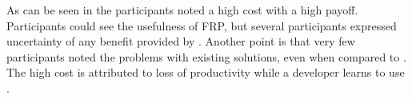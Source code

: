 As can be seen in  the participants noted a high cost with a high payoff. Participants could see the usefulness of \gls{FRP}, but several participants expressed uncertainty of any benefit provided by \fsh. Another point is that very few participants noted the problems with existing solutions, even when compared to \fsh. The high cost is attributed to loss of productivity while a developer learns to use \fsh.
